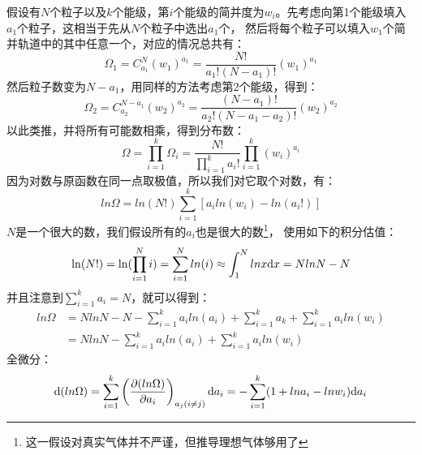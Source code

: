 \documentclass{Physics_H_Notes}
\begin{document}
\begin{prove}
            假设有$N$个粒子以及$k$个能级，第$i$个能级的简并度为$w_i$。先考虑向第1个能级填入$a_1$个粒子，这相当于先从$N$个粒子中选出$a_1$个，
            然后将每个粒子可以填入$w_1$个简并轨道中的其中任意一个，对应的情况总共有：
            \begin{equation}
                \Omega_1 =C_{a_1}^{N} (w_1)^{a_1} = \frac{N!}{a_{1}!(N-a_{1})!} (w_1)^{a_1}
            \end{equation}
            然后粒子数变为$N-a_1$，用同样的方法考虑第2个能级，得到：
            \begin{equation}
                \Omega_2 =C_{a_2}^{N-a_1} (w_2)^{a_2} = \frac{(N-a_1)!}{a_{2}!(N-a_{1}-a_{2})!} (w_2)^{a_2}
            \end{equation}
            以此类推，并将所有可能数相乘，得到分布数：
            \begin{equation}
                \Omega = \prod_{i=1}^{k} \Omega_{i} = \frac{N!}{\prod_{i = 1}^{k}a_{i}!}\prod_{i = 1}^{k} (w_i)^{a_i}
            \end{equation}
            因为对数与原函数在同一点取极值，所以我们对它取个对数，有：
            \begin{equation}
                ln\Omega = ln(N!)\sum_{i = 1}^{k}[{a_i}ln(w_i) - ln(a_i!)]
            \end{equation}
            $N$是一个很大的数，我们假设所有的$a_i$也是很大的数\footnote{这一假设对真实气体并不严谨，但推导理想气体够用了}，
            使用如下的积分估值：
            \begin{equation}
                \ln(N!) = \ln(\prod_{i=1}^{N}i)=\sum_{i=1}^{N}ln(i) \approx \int_{1}^{N}lnx\mathrm{d}{x} = NlnN-N
            \end{equation}
            并且注意到$\sum_{i=1}^{k}a_i=N$，就可以得到：
            \begin{equation}
                \begin{aligned}
                    ln\Omega &= NlnN-N-\sum_{i=1}^{k}a_{i}ln(a_i)+\sum_{i=1}^{k}a_k+\sum_{i = 1}^{k}{a_i}ln(w_i)\\
                    &=NlnN-\sum_{i=1}^{k}a_{i}ln(a_i)+\sum_{i = 1}^{k}{a_i}ln(w_i)
                    \label{of_omega}
                \end{aligned}
            \end{equation}
            全微分：
            \begin{equation}
                \dif{(ln\Omega)} = \sum_{i=1}^{k}\left(\frac{\partial (ln\Omega)}{\partial a_i}\right)_{a_j(i\neq j)} \dif{a_i} = 
                -\sum_{i=1}^{k}(1+ln a_i-ln w_i)\dif{a_i} 

\end{equation}
\end{prove}
\end{document}
